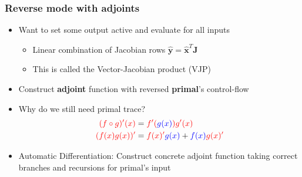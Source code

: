 \documentclass[11pt]{beamer}
\begin{document}
\begin{frame}
	\frametitle{Reverse mode with adjoints}

	\begin{itemize}
		\item Want to set some output active and evaluate for all inputs
			\begin{itemize}
				\item Linear combination of Jacobian rows \( \mathbf{\hat{y}} = \mathbf{\hat{x}}^T \mathbf{J} \)
				\item This is called the Vector-Jacobian product (VJP)
			\end{itemize}

		\pause
		\item Construct \textbf{adjoint} function with reversed \textbf{primal}'s control-flow 
		\pause
		\item Why do we still need primal trace?
			\begin{align}
				\color{red}(f \circ g)'(x) &= \color{red}f'(\textcolor{blue}{g(x)})g'(x) \\
				\color{red}(f(x) g(x))' &= \textcolor{red}{f(x)'}\textcolor{blue}{g(x)} + \textcolor{blue}{f(x)}\textcolor{red}{g(x)'}
			\end{align}
		\item Automatic Differentiation: Construct concrete adjoint function taking correct branches and recursions for primal's input
	\end{itemize}
\end{frame}
\end{document}
